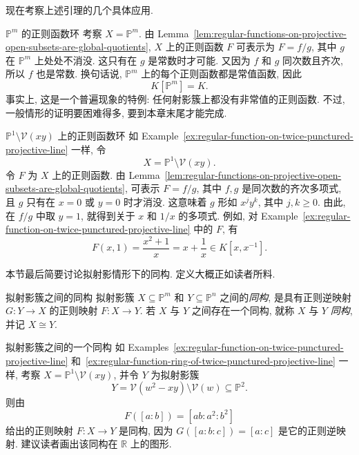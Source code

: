 现在考察上述引理的几个具体应用.

\begin{Example}{$\mathbb{P}^{m}$ 的正则函数环}\leavevmode\label{ex:regular-functions-on-projective-space-are-constant}
考察 $X=\mathbb{P}^{m}$. 由 Lemma~\ref{lem:regular-functions-on-projective-open-subsets-are-global-quotients}, $X$ 上的正则函数 $F$ 可表示为 $F=f/g$, 其中 $g$ 在 $\mathbb{P}^{m}$ 上处处不消没. 这只有在 $g$ 是常数时才可能. 又因为 $f$ 和 $g$ 同次数且齐次, 所以 $f$ 也是常数. 换句话说, $\mathbb{P}^{m}$ 上的每个正则函数都是常值函数, 因此
\[
  K[\mathbb{P}^{m}]=K.
\]
事实上, 这是一个普遍现象的特例: 任何射影簇上都没有非常值的正则函数. 不过, 一般情形的证明要困难得多, 要到本章末尾才能完成.
\end{Example}

\begin{Example}{$\mathbb{P}^{1}\setminus\mathcal{V}(xy)$ 上的正则函数环}\leavevmode\label{ex:regular-function-ring-of-twice-punctured-projective-line}
如 Example~\ref{ex:regular-function-on-twice-punctured-projective-line} 一样, 令
\[
  X=\mathbb{P}^{1}\setminus\mathcal{V}(xy).
\]
令 $F$ 为 $X$ 上的正则函数. 由 Lemma~\ref{lem:regular-functions-on-projective-open-subsets-are-global-quotients}, 可表示 $F=f/g$, 其中 $f,g$ 是同次数的齐次多项式, 且 $g$ 只有在 $x=0$ 或 $y=0$ 时才消没. 这意味着 $g$ 形如 $x^{j}y^{k}$, 其中 $j,k\ge0$. 由此, 在 $f/g$ 中取 $y=1$, 就得到关于 $x$ 和 $1/x$ 的多项式. 例如, 对 Example~\ref{ex:regular-function-on-twice-punctured-projective-line} 中的 $F$, 有
\[
  F(x,1)=\frac{x^{2}+1}{x}=x+\frac{1}{x}\in K[x,x^{-1}].
\]
\end{Example}

本节最后简要讨论拟射影情形下的同构. 定义大概正如读者所料.

\begin{Definition}{拟射影簇之间的同构}\leavevmode\label{def:isomorphism-of-quasiprojective-varieties}
拟射影簇 $X\subseteq\mathbb{P}^{m}$ 和 $Y\subseteq\mathbb{P}^{n}$ 之间的\emph{同构}, 是具有正则逆映射 $G:Y\to X$ 的正则映射 $F:X\to Y$. 若 $X$ 与 $Y$ 之间存在一个同构, 就称 $X$ 与 $Y$ \emph{同构}, 并记 $X\cong Y$.
\end{Definition}

\begin{Example}{拟射影簇之间的一个同构}\leavevmode\label{ex:isomorphism-of-punctured-projective-line-and-conic}
如 Examples~\ref{ex:regular-function-on-twice-punctured-projective-line} 和~\ref{ex:regular-function-ring-of-twice-punctured-projective-line} 一样, 考察 $X=\mathbb{P}^{1}\setminus\mathcal{V}(xy)$, 并令 $Y$ 为拟射影簇
\[
  Y=\mathcal{V}(w^{2}-xy)\setminus\mathcal{V}(w)\subseteq\mathbb{P}^{2}.
\]
则由
\[
  F([a:b])=[ab:a^{2}:b^{2}]
\]
给出的正则映射 $F:X\to Y$ 是同构, 因为 $G([a:b:c])=[a:c]$ 是它的正则逆映射. 建议读者画出该同构在 $\mathbb{R}$ 上的图形.
\end{Example}

